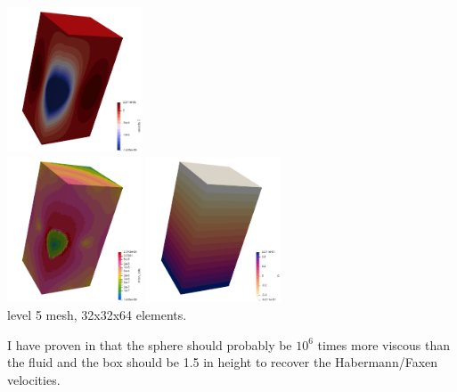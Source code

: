 \begin{center}
\includegraphics[width=4cm]{images/stokes_sphere3D/aspect_gr_CYL/w}\\
\includegraphics[width=4cm]{images/stokes_sphere3D/aspect_gr_CYL/sr}
\includegraphics[width=4cm]{images/stokes_sphere3D/aspect_gr_CYL/press}\\
{\captionfont level 5 mesh, 32x32x64 elements.}
\end{center}

I have proven in  that the sphere should probably be $10^6$
times more viscous than the fluid and the box should be 1.5 in height 
to recover the Habermann/Faxen velocities. 

